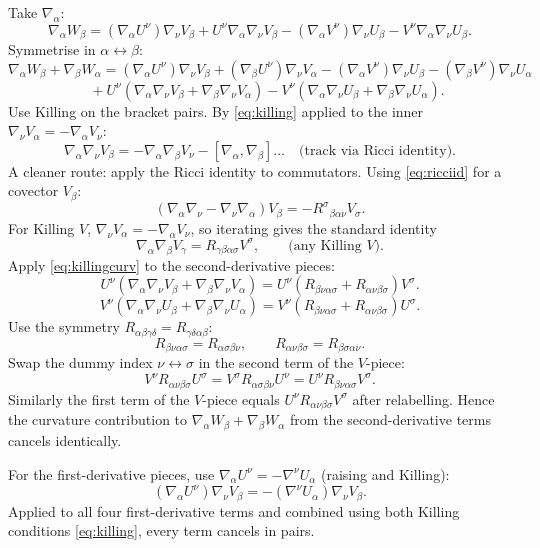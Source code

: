 \documentclass[11pt]{article}
\begin{document}
Take $\nabla_\alpha$:
\[
\nabla_\alpha W_\beta = (\nabla_\alpha U^\nu)\nabla_\nu V_\beta + U^\nu\nabla_\alpha\nabla_\nu V_\beta - (\nabla_\alpha V^\nu)\nabla_\nu U_\beta - V^\nu\nabla_\alpha\nabla_\nu U_\beta.
\]
Symmetrise in $\alpha\leftrightarrow\beta$:
\[
\nabla_\alpha W_\beta + \nabla_\beta W_\alpha = (\nabla_\alpha U^\nu)\nabla_\nu V_\beta + (\nabla_\beta U^\nu)\nabla_\nu V_\alpha - (\nabla_\alpha V^\nu)\nabla_\nu U_\beta - (\nabla_\beta V^\nu)\nabla_\nu U_\alpha
\]
\[
\quad + U^\nu(\nabla_\alpha\nabla_\nu V_\beta + \nabla_\beta\nabla_\nu V_\alpha) - V^\nu(\nabla_\alpha\nabla_\nu U_\beta + \nabla_\beta\nabla_\nu U_\alpha).
\]
Use Killing on the bracket pairs. By \eqref{eq:killing} applied to the inner $\nabla_\nu V_\alpha=-\nabla_\alpha V_\nu$:
\[
\nabla_\alpha\nabla_\nu V_\beta = -\nabla_\alpha\nabla_\beta V_\nu - [\nabla_\alpha,\nabla_\beta]\!\dots\quad\text{(track via Ricci identity)}.
\]
A cleaner route: apply the Ricci identity to commutators. Using \eqref{eq:ricciid} for a covector $V_\beta$:
\[
(\nabla_\alpha\nabla_\nu - \nabla_\nu\nabla_\alpha)V_\beta = -R^\sigma{}_{\beta\alpha\nu}V_\sigma.
\]
For Killing $V$, $\nabla_\nu V_\alpha=-\nabla_\alpha V_\nu$, so iterating gives the standard identity
\begin{equation}
\nabla_\alpha\nabla_\beta V_\gamma = R_{\gamma\beta\alpha\sigma}V^\sigma,\qquad\text{(any Killing $V$)}.
\label{eq:killingcurv}
\end{equation}
Apply \eqref{eq:killingcurv} to the second-derivative pieces:
\[
U^\nu(\nabla_\alpha\nabla_\nu V_\beta + \nabla_\beta\nabla_\nu V_\alpha) = U^\nu\!\left(R_{\beta\nu\alpha\sigma} + R_{\alpha\nu\beta\sigma}\right)\!V^\sigma.
\]
\[
V^\nu(\nabla_\alpha\nabla_\nu U_\beta + \nabla_\beta\nabla_\nu U_\alpha) = V^\nu\!\left(R_{\beta\nu\alpha\sigma} + R_{\alpha\nu\beta\sigma}\right)\!U^\sigma.
\]
Use the symmetry $R_{\alpha\beta\gamma\delta}=R_{\gamma\delta\alpha\beta}$:
\[
R_{\beta\nu\alpha\sigma} = R_{\alpha\sigma\beta\nu},\qquad R_{\alpha\nu\beta\sigma}=R_{\beta\sigma\alpha\nu}.
\]
Swap the dummy index $\nu\leftrightarrow\sigma$ in the second term of the $V$-piece:
\[
V^\nu R_{\alpha\nu\beta\sigma}U^\sigma = V^\sigma R_{\alpha\sigma\beta\nu}U^\nu = U^\nu R_{\beta\nu\alpha\sigma}V^\sigma.
\]
Similarly the first term of the $V$-piece equals $U^\nu R_{\alpha\nu\beta\sigma}V^\sigma$ after relabelling. Hence the curvature contribution to $\nabla_\alpha W_\beta+\nabla_\beta W_\alpha$ from the second-derivative terms cancels identically.

For the first-derivative pieces, use $\nabla_\alpha U^\nu = -\nabla^\nu U_\alpha$ (raising and Killing):
\[
(\nabla_\alpha U^\nu)\nabla_\nu V_\beta = -(\nabla^\nu U_\alpha)\nabla_\nu V_\beta.
\]
Applied to all four first-derivative terms and combined using both Killing conditions \eqref{eq:killing}, every term cancels in pairs.
\end{document}

